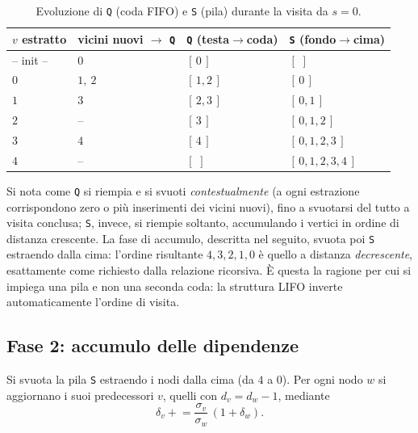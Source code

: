 \documentclass[11pt,a4paper]{report}
\begin{document}
\begin{table}[H]
	\centering
	\caption{Evoluzione di \texttt{Q} (coda FIFO) e \texttt{S} (pila) durante la
		visita da $s=0$.}
	\label{tab:qs}
	\begin{tabular}{l l l l}
		\toprule
		$v$ estratto & vicini nuovi $\to$ \texttt{Q} & \texttt{Q} (testa$\to$coda) & \texttt{S} (fondo$\to$cima) \\
		\midrule
		-- init -- & $0$     & $[\,0\,]$       & $[\,\,]$            \\
		$0$        & $1,\ 2$ & $[\,1,2\,]$     & $[\,0\,]$           \\
		$1$        & $3$     & $[\,2,3\,]$     & $[\,0,1\,]$         \\
		$2$        & --      & $[\,3\,]$       & $[\,0,1,2\,]$       \\
		$3$        & $4$     & $[\,4\,]$       & $[\,0,1,2,3\,]$     \\
		$4$        & --      & $[\,\,]$        & $[\,0,1,2,3,4\,]$   \\
		\bottomrule
	\end{tabular}
\end{table}

Si nota come \texttt{Q} si riempia e si svuoti \emph{contestualmente} (a ogni
estrazione corrispondono zero o più inserimenti dei vicini nuovi), fino a
svuotarsi del tutto a visita conclusa; \texttt{S}, invece, si riempie soltanto,
accumulando i vertici in ordine di distanza crescente. La fase di accumulo,
descritta nel seguito, svuota poi \texttt{S} estraendo dalla cima: l'ordine
risultante $4,3,2,1,0$ è quello a distanza \emph{decrescente}, esattamente come
richiesto dalla relazione ricorsiva. È questa la ragione per cui si impiega una
pila e non una seconda coda: la struttura LIFO inverte automaticamente l'ordine
di visita.

\subsection*{Fase 2: accumulo delle dipendenze}

Si svuota la pila \texttt{S} estraendo i nodi dalla cima (da $4$ a $0$). Per ogni nodo $w$ si
aggiornano i suoi predecessori $v$, quelli con $d_v = d_w-1$, mediante
\[
	\delta_v \mathrel{+}= \frac{\sigma_v}{\sigma_w}\,(1+\delta_w).
\]
\end{document}
